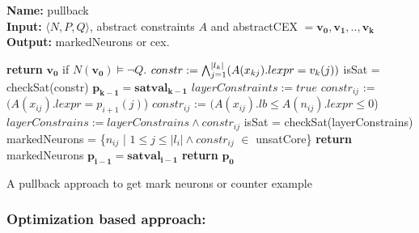 \begin{algorithm}[t]
  \textbf{Name: } pullback \\
  \textbf{Input: } $\langle N,P,Q \rangle$, abstract constraints $A$ and abstractCEX $=\boldsymbol{v_0}, \boldsymbol{v_1}, .., \boldsymbol{v_k}$ \\
  \textbf{Output: } markedNeurons or cex. 
  \begin{algorithmic}[1]
   \State \textbf{return} $\boldsymbol{v_0}$ if $N(\boldsymbol{v_0}) \models \neg Q$. 
   \State $constr := \bigwedge_{j=1}^{|l_k|} (A(x_{kj}).lexpr = v_k(j))$
   \State isSat = checkSat(constr)
    
      \State $\boldsymbol{p_{k-1}} = \boldsymbol{satval_{k-1}}$ 
   \EndIf
        \State $layerConstraints := true$
            \State $constr_{ij}$ := $(A(x_{ij}).lexpr = p_{i+1}(j)$) 
          \Else
            \State $constr_{ij}$ := $(A(x_{ij}).lb \leq A(n_{ij}).lexpr \leq 0$)
          \EndIf
          \State $layerConstrains := layerConstrains \land constr_{ij}$
        \EndFor
        \State isSat = checkSat(layerConstrains)
          \State markedNeurons = \{$n_{ij}$ | $1 \leq j\leq |l_i| \land constr_{ij}$ $\in$ unsatCore\}
          \State \textbf{return } markedNeurons
        \Else
          \State $\boldsymbol{p_{i-1}} = \boldsymbol{satval_{i-1}}$
        \EndIf
      \EndIf
   \EndFor
    \State \textbf{return} $\boldsymbol{p_0}$ 
  \end{algorithmic}
  \caption{A pullback approach to get mark neurons or counter example}
  \label{algo:refine1}
\end{algorithm}

\subsubsection{Optimization based approach: }

